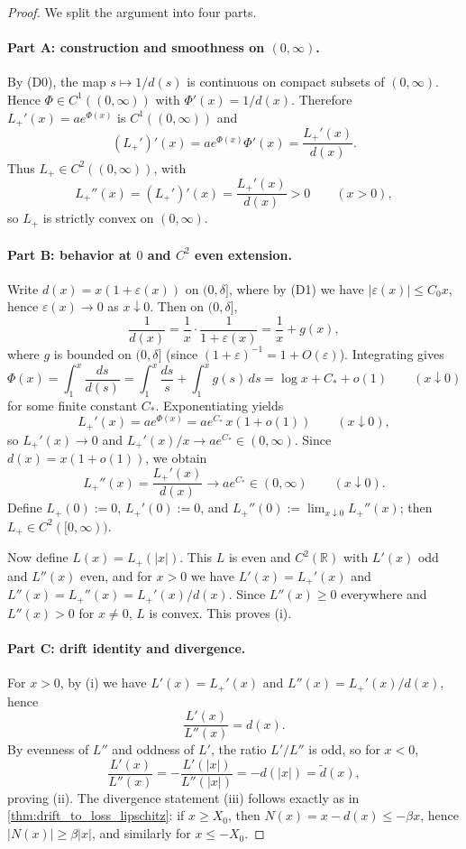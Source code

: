 \documentclass{article}
\theoremstyle{plain}
\theoremstyle{definition}
\theoremstyle{remark}
\begin{document}
\begin{proof}
We split the argument into four parts.

\paragraph{Part A: construction and smoothness on $(0,\infty)$.}
By (D0), the map $s\mapsto 1/d(s)$ is continuous on compact subsets of $(0,\infty)$.
Hence $\Phi\in C^1((0,\infty))$ with $\Phi'(x)=1/d(x)$.
Therefore $L_+'(x)=a e^{\Phi(x)}$ is $C^1((0,\infty))$ and
\[
(L_+')'(x)=a e^{\Phi(x)}\Phi'(x)=\frac{L_+'(x)}{d(x)}.
\]
Thus $L_+\in C^2((0,\infty))$, with
\[
L_+''(x)=(L_+')'(x)=\frac{L_+'(x)}{d(x)}>0 \qquad (x>0),
\]
so $L_+$ is strictly convex on $(0,\infty)$.

\paragraph{Part B: behavior at $0$ and $C^2$ even extension.}
Write $d(x)=x(1+\varepsilon(x))$ on $(0,\delta]$, where by (D1) we have
$|\varepsilon(x)|\le C_0x$, hence $\varepsilon(x)\to 0$ as $x\downarrow 0$.
Then on $(0,\delta]$,
\[
\frac{1}{d(x)}=\frac{1}{x}\cdot \frac{1}{1+\varepsilon(x)}
=\frac{1}{x}+g(x),
\]
where $g$ is bounded on $(0,\delta]$ (since $(1+\varepsilon)^{-1}=1+O(\varepsilon)$).
Integrating gives
\[
\Phi(x)=\int_1^x \frac{ds}{d(s)}
=\int_1^x \frac{ds}{s}+\int_1^x g(s)\,ds
=\log x + C_\ast + o(1)\qquad (x\downarrow 0)
\]
for some finite constant $C_\ast$.
Exponentiating yields
\[
L_+'(x)=a e^{\Phi(x)}=a e^{C_\ast}\,x(1+o(1))\qquad (x\downarrow 0),
\]
so $L_+'(x)\to 0$ and $L_+'(x)/x\to a e^{C_\ast}\in(0,\infty)$.
Since $d(x)=x(1+o(1))$, we obtain
\[
L_+''(x)=\frac{L_+'(x)}{d(x)}\to a e^{C_\ast}\in(0,\infty)\qquad (x\downarrow 0).
\]
Define $L_+(0):=0$, $L_+'(0):=0$, and $L_+''(0):=\lim_{x\downarrow 0}L_+''(x)$; then
$L_+\in C^2([0,\infty))$.

Now define $L(x)=L_+(|x|)$. This $L$ is even and $C^2(\mathbb{R})$ with
$L'(x)$ odd and $L''(x)$ even, and for $x>0$ we have
$L'(x)=L_+'(x)$ and $L''(x)=L_+''(x)=L_+'(x)/d(x)$.
Since $L''(x)\ge 0$ everywhere and $L''(x)>0$ for $x\neq 0$, $L$ is convex.
This proves (i).

\paragraph{Part C: drift identity and divergence.}
For $x>0$, by (i) we have $L'(x)=L_+'(x)$ and $L''(x)=L_+'(x)/d(x)$, hence
\[
\frac{L'(x)}{L''(x)}=d(x).
\]
By evenness of $L''$ and oddness of $L'$, the ratio $L'/L''$ is odd, so for $x<0$,
\[
\frac{L'(x)}{L''(x)}=-\frac{L'(|x|)}{L''(|x|)}=-d(|x|)=\tilde d(x),
\]
proving (ii). The divergence statement (iii) follows exactly as in \cref{thm:drift_to_loss_lipschitz}:
if $x\ge X_0$, then $N(x)=x-d(x)\le -\beta x$, hence $|N(x)|\ge \beta|x|$, and similarly for $x\le -X_0$.


\end{proof}
\end{document}
